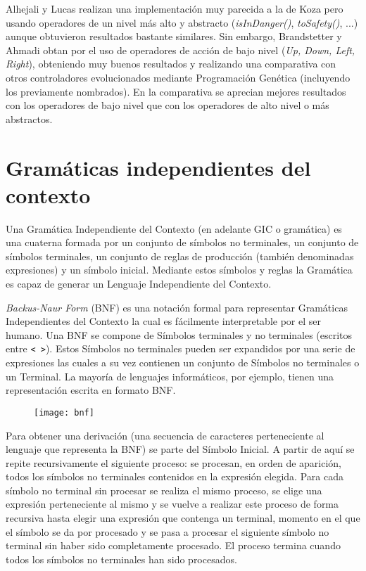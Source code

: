 Alhejali y Lucas\cite{alhejali2010evolving} realizan una implementación muy parecida a la de Koza pero usando operadores de un nivel más alto y abstracto (\textit{isInDanger()}, \textit{toSafety()}, ...) aunque obtuvieron resultados bastante similares. Sin embargo, Brandstetter y Ahmadi\cite{brandstetter2012reactive} obtan por el uso de operadores de acción de bajo nivel (\textit{Up, Down, Left, Right}), obteniendo muy buenos resultados y realizando una comparativa con otros controladores evolucionados mediante Programación Genética (incluyendo los previamente nombrados). En la comparativa se aprecian mejores resultados con los operadores de bajo nivel que con los operadores de alto nivel o más abstractos.

\section{Gramáticas independientes del contexto}
Una Gramática Independiente del Contexto (en adelante GIC o gramática) es una cuaterna formada por un conjunto de símbolos no terminales, un conjunto de símbolos terminales, un conjunto de reglas de producción (también denominadas expresiones) y un símbolo inicial. Mediante estos símbolos y reglas la Gramática es capaz de generar un Lenguaje Independiente del Contexto\cite{HolgerApuntes}.

\textit{Backus-Naur Form} (BNF) es una notación formal para representar Gramáticas Independientes del Contexto la cual es fácilmente interpretable por el ser humano. Una BNF se compone de Símbolos terminales y no terminales (escritos entre \texttt{< >}). Estos Símbolos no terminales pueden ser expandidos por una serie de expresiones las cuales a su vez contienen un conjunto de Símbolos no terminales o un Terminal. La mayoría de lenguajes informáticos, por ejemplo, tienen una representación escrita en formato BNF\cite{garshol2003bnf}.

\begin{figure}[H]
\centering
\texttt{[image: bnf]}
\end{figure}

Para obtener una derivación (una secuencia de caracteres perteneciente al lenguaje que representa la BNF) se parte del Símbolo Inicial. A partir de aquí se repite recursivamente el siguiente proceso: se procesan, en orden de aparición, todos los símbolos no terminales contenidos en la expresión elegida. Para cada símbolo no terminal sin procesar se realiza el mismo proceso, se elige una expresión perteneciente al mismo y se vuelve a realizar este proceso de forma recursiva hasta elegir una expresión que contenga un terminal, momento en el que el símbolo se da por procesado y se pasa a procesar el siguiente símbolo no terminal sin haber sido completamente procesado. El proceso termina cuando todos los símbolos no terminales han sido procesados.

